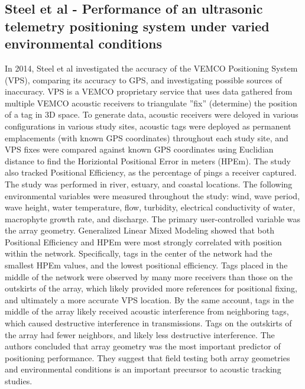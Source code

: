 \subsection {Steel et al - Performance of an ultrasonic telemetry positioning system under varied environmental conditions}
In 2014, Steel et al\cite{Steel2014} investigated the accuracy of the VEMCO Positioning System (VPS), comparing its accuracy to GPS, and investigating possible sources of inaccuracy.  VPS is a VEMCO proprietary service that uses data gathered from multiple VEMCO acoustic receivers to triangulate ''fix'' (determine) the position of a tag in 3D space.  To generate data, acoustic receivers were deloyed in various configurations in various study sites, acoustic tags were deployed as permanent emplacements (with known GPS coordinates) throughout each study site, and VPS fixes were compared against known GPS coordinates using Euclidian distance to find the Horiziontal Positional Error in meters (HPEm).  The study also tracked Positional Efficiency, as the percentage of pings a receiver captured.  The study was performed in river, estuary, and coastal locations.  The following environmental variables were measured throughout the study: wind, wave period, wave height, water temperature, flow, turbidity, electrical conductivity of water, macrophyte growth rate, and discharge.  The primary user-controlled variable was the array geometry.  Generalized Linear Mixed Modeling showed that both Positional Efficiency and HPEm were most strongly correlated with position within the network.  Specifically, tags in the center of the network had the smallest HPEm values, and the lowest positional efficiency.  Tags placed in the middle of the network were observed by many more receivers than those on the outskirts of the array, which likely provided more references for positional fixing, and ultimately a more accurate VPS location.  By the same account, tags in the middle of the array likely received acoustic interference from neighboring tags, which  caused destructive interference in transmissions.  Tags on the outskirts of the array had fewer neighbors, and likely less destructive interference.  The authors concluded that array geometry was the most important predictor of positioning performance. They suggest that field testing both array geometries and environmental conditions is an important precursor to acoustic tracking studies.



